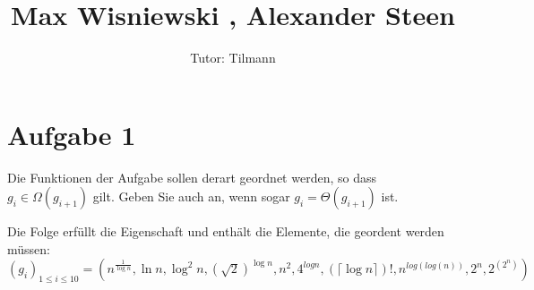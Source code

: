 \documentclass[11pt,a4paper,ngerman]{article}
\author{Tutor: Tilmann}
\date{}
\title{Max Wisniewski , Alexander Steen}
\begin{document}

\maketitle
\thispagestyle{fancy}

\section*{Aufgabe 1}

Die Funktionen der Aufgabe sollen derart geordnet werden, so dass $ g_i \in \Omega (g_{i+1}) $ gilt. Geben Sie auch an, wenn sogar $ g_i = \Theta (g_{i+1}) $ ist. 

\vspace{12px}

Die Folge erfüllt die Eigenschaft und enthält die Elemente, die geordent werden müssen:\\

$(g_i)_{1 \leq i \leq 10} = ( n^{\frac{1}{\log{n}}} , \ln{n} , \log^2{n}  , (\sqrt{2})^{\log{n}}  ,  n^2 ,  4^{log{n}} , (\lceil \log{n} \rceil)! ,   n^{log{(log{(n)})}} ,  2^n  , 2^{(2^n)})$
\end{document}

